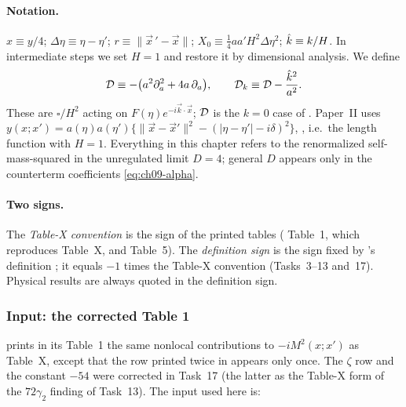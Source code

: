 \paragraph{Notation.}
$x\equiv y/4$; $\Delta\eta\equiv\eta-\eta'$; $r\equiv\|\vec x\,'-\vec x\|$; $X_0\equiv\tfrac14aa'H^2\Delta\eta^2$; $\hat k\equiv k/H$.
In intermediate steps we set $H=1$ and restore it by dimensional analysis. We define
\begin{equation}
\mathcal{D}\equiv-\big(a^2\partial_a^2+4a\,\partial_a\big),\qquad \mathcal{D}_k\equiv\mathcal{D}-\frac{\hat k^2}{a^2}.
\label{eq:ch09-Dop}
\end{equation}
These are $\square/H^2$ acting on $F(\eta)e^{-i\vec k\cdot\vec x}$; $\mathcal{D}$ is the $k=0$ case of .
Paper~II uses $y(x;x')=a(\eta)a(\eta')\{\|\vec x-\vec x'\|^2-(|\eta-\eta'|-i\delta)^2\}$, , i.e.\ the length function with $H=1$.
Everything in this chapter refers to the renormalized self-mass-squared in the unregulated limit $D=4$; general $D$ appears only in
the counterterm coefficients \eqref{eq:ch09-alpha}.

\paragraph{Two signs.} \tA{}
The \emph{Table-X convention} is the sign of the printed tables (\PII{} Table~1, which reproduces \PI{} Table~X, and \PII{} Table~5).
The \emph{definition sign} is the sign fixed by \PI's definition ; it equals $-1$ times the Table-X convention
(Tasks~3--13 and~17). Physical results are always quoted in the definition sign.

\subsubsection{Input: the corrected Table 1}

\PII{} prints in its Table~1 \tP{} the same nonlocal contributions to $-iM^2(x;x')$ as \PI{} Table~X, except that the row printed twice in \PI{} appears only once.
The $\zeta$ row and the constant $-54$ were corrected in Task~17 (the latter as the Table-X form of the $72\gamma_2$ finding of Task~13). The input used here is:

